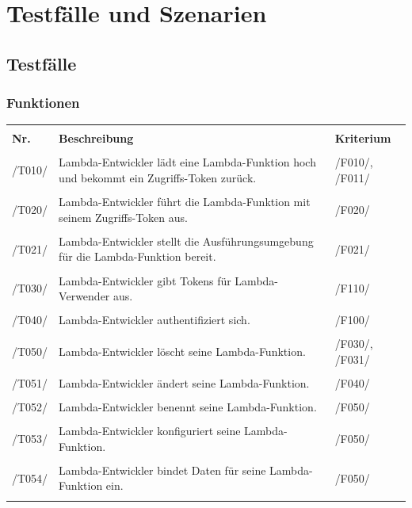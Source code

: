 \documentclass[a4paper,20pt,oneside]{book}
\begin{document}
\chapter{Testfälle und Szenarien}
\section{Testfälle}
\subsection{Funktionen}
\begin{longtable}{lp{10cm}p{3cm}}
\hline \\
\textbf{Nr.} & \textbf{Beschreibung} & \textbf{Kriterium} \\ \hline\hline \\ 
/T010/ & \Gls{Lambda-Entwickler} lädt eine \gls{Lambda-Funktion} hoch und bekommt ein Zugriffs-\gls{Token} zurück. & /F010/, /F011/   \\ \hline \\
/T020/ & \Gls{Lambda-Entwickler} führt die \gls{Lambda-Funktion} mit seinem Zugriffs-\gls{Token} aus. & /F020/\\ \hline \\
/T021/ & \Gls{Lambda-Entwickler} stellt die Ausführungsumgebung für die \gls{Lambda-Funktion} bereit. & /F021/\\ \hline \\
/T030/ & \Gls{Lambda-Entwickler} gibt \glspl{Token} für \Gls{Lambda-Verwender} aus. & /F110/\\ \hline \\
/T040/ & \Gls{Lambda-Entwickler} authentifiziert sich. & /F100/\\ \hline \\
/T050/ & \Gls{Lambda-Entwickler} löscht seine \gls{Lambda-Funktion}. & /F030/, /F031/\\ \hline \\
/T051/ & \Gls{Lambda-Entwickler} ändert seine \gls{Lambda-Funktion}. & /F040/\\ \hline \\
/T052/ & \Gls{Lambda-Entwickler} benennt seine \gls{Lambda-Funktion}. & /F050/\\ \hline \\
/T053/ & \Gls{Lambda-Entwickler} konfiguriert seine \gls{Lambda-Funktion}. & /F050/\\ \hline \\
/T054/ & \Gls{Lambda-Entwickler} bindet Daten für seine \gls{Lambda-Funktion} ein. & /F050/\\ \hline \\

\end{longtable}
\end{document}
